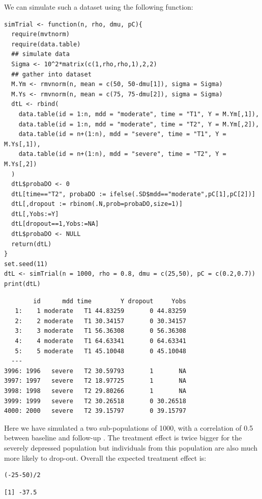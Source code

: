 \documentclass[12pt]{article}
\begin{document}
We can simulate such a dataset using the following function:
\lstset{language=r,label= ,caption= ,captionpos=b,numbers=none}
\begin{lstlisting}
simTrial <- function(n, rho, dmu, pC){
  require(mvtnorm)
  require(data.table)
  ## simulate data
  Sigma <- 10^2*matrix(c(1,rho,rho,1),2,2)
  ## gather into dataset
  M.Ym <- rmvnorm(n, mean = c(50, 50-dmu[1]), sigma = Sigma)
  M.Ys <- rmvnorm(n, mean = c(75, 75-dmu[2]), sigma = Sigma)
  dtL <- rbind(
    data.table(id = 1:n, mdd = "moderate", time = "T1", Y = M.Ym[,1]),
    data.table(id = 1:n, mdd = "moderate", time = "T2", Y = M.Ym[,2]),
    data.table(id = n+(1:n), mdd = "severe", time = "T1", Y = M.Ys[,1]),
    data.table(id = n+(1:n), mdd = "severe", time = "T2", Y = M.Ys[,2])
  )
  dtL$probaDO <- 0
  dtL[time=="T2", probaDO := ifelse(.SD$mdd=="moderate",pC[1],pC[2])]
  dtL[,dropout := rbinom(.N,prob=probaDO,size=1)]
  dtL[,Yobs:=Y]
  dtL[dropout==1,Yobs:=NA]
  dtL$probaDO <- NULL
  return(dtL)
}
set.seed(11)
dtL <- simTrial(n = 1000, rho = 0.8, dmu = c(25,50), pC = c(0.2,0.7))
print(dtL)
\end{lstlisting}

\begin{verbatim}
        id      mdd time        Y dropout     Yobs
   1:    1 moderate   T1 44.83259       0 44.83259
   2:    2 moderate   T1 30.34157       0 30.34157
   3:    3 moderate   T1 56.36308       0 56.36308
   4:    4 moderate   T1 64.63341       0 64.63341
   5:    5 moderate   T1 45.10048       0 45.10048
  ---                                             
3996: 1996   severe   T2 30.59793       1       NA
3997: 1997   severe   T2 18.97725       1       NA
3998: 1998   severe   T2 29.80266       1       NA
3999: 1999   severe   T2 30.26518       0 30.26518
4000: 2000   severe   T2 39.15797       0 39.15797
\end{verbatim}

Here we have simulated a two sub-populations of 1000, with a
correlation of 0.5 between baseline and follow-up . The treatment
effect is twice bigger for the severely depressed population but
individuals from this population are also much more likely to
drop-out. Overall the expected treatment effect is:
\lstset{language=r,label= ,caption= ,captionpos=b,numbers=none}
\begin{lstlisting}
(-25-50)/2
\end{lstlisting}

\begin{verbatim}
[1] -37.5
\end{verbatim}
\end{document}
